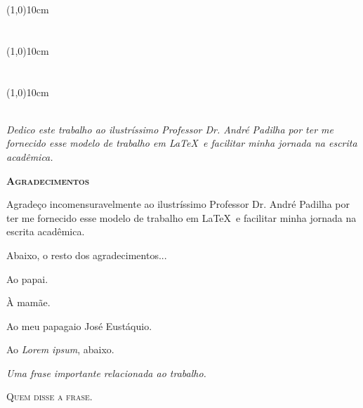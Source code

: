 {\begin{center}
        \vspace*{2cm}
        \line(1,0){10cm}\\
        \textbf{\titorientador\ \orientador\ \printorientador}\\
        \localorientador\\
        	
        \vspace*{2cm}
        \line(1,0){10cm}\\
        \textbf{\titavaliadorum\ \avaliadorum}\\
        \localavalum\\
        	
        \vspace*{2cm}
        \line(1,0){10cm}\\
        \textbf{\titavaliadordois\ \avaliadordois}\\
        \localavaldois
    \end{center}

\newpage
\thispagestyle{empty}
\vspace*{15cm}
\begin{flushright}
    \SingleSpacing\textit{Dedico este trabalho ao ilustríssimo Professor Dr. André Padilha por ter me fornecido esse modelo de trabalho em \LaTeX\ e facilitar minha jornada na escrita acadêmica.}
\end{flushright}

\newpage
\pagestyle{empty}
\begin{center}
	\textbf{\textsc{Agradecimentos}}
\end{center}
Agradeço incomensuravelmente ao ilustríssimo Professor Dr. André Padilha por ter me fornecido esse modelo de trabalho em \LaTeX\ e facilitar minha jornada na escrita acadêmica.

\noindent Abaixo, o resto dos agradecimentos...

\noindent Ao papai.

\noindent À mamãe.

\noindent Ao meu papagaio José Eustáquio. 

\noindent Ao \textit{Lorem ipsum}, abaixo.

\noindent  \lipsum[10]

\newpage
\thispagestyle{empty}
\vspace*{\fill}
\epigraph{\textit{Uma frase importante relacionada ao trabalho.}}{\textsc{Quem disse a frase.}}

}
